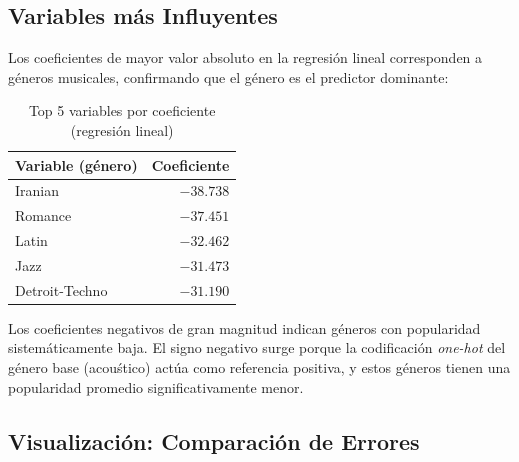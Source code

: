 \documentclass[12pt,a4paper]{article}
\begin{document}
\subsection{Variables m\'as Influyentes}

Los coeficientes de mayor valor absoluto en la regresi\'on lineal corresponden a
g\'eneros musicales, confirmando que el g\'enero es el predictor dominante:

\begin{table}[H]
\centering
\caption{Top 5 variables por coeficiente (regresi\'on lineal)}
\begin{tabular}{lr}
\toprule
\textbf{Variable (g\'enero)} & \textbf{Coeficiente} \\
\midrule
Iranian        & $-38.738$ \\
Romance        & $-37.451$ \\
Latin          & $-32.462$ \\
Jazz           & $-31.473$ \\
Detroit-Techno & $-31.190$ \\
\bottomrule
\end{tabular}
\end{table}

Los coeficientes negativos de gran magnitud indican g\'eneros con popularidad
sistem\'aticamente baja. El signo negativo surge porque la codificaci\'on
\textit{one-hot} del g\'enero base (acou\'stico) act\'ua como referencia positiva,
y estos g\'eneros tienen una popularidad promedio significativamente menor.

\subsection{Visualizaci\'on: Comparaci\'on de Errores}
\end{document}
